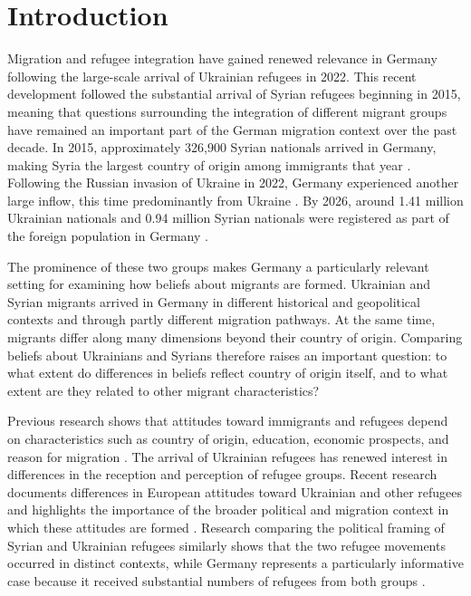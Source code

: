 \section{Introduction}

Migration and refugee integration have gained renewed relevance in Germany following the large-scale arrival of 
Ukrainian refugees in 2022. This recent development followed the substantial arrival of Syrian refugees beginning 
in 2015, meaning that questions surrounding the integration of different migrant groups have remained an important 
part of the German migration context over the past decade. In 2015, approximately 326,900 Syrian nationals arrived 
in Germany, making Syria the largest country of origin among immigrants that year \citep{bamf2015migration}. 
Following the Russian invasion of Ukraine in 2022, Germany experienced another large inflow, this time predominantly 
from Ukraine \citep{bamf2022migration}. By 2026, around 1.41 million Ukrainian nationals and 0.94 million Syrian 
nationals were registered as part of the foreign population in Germany \citep{destatis2026foreign}.

The prominence of these two groups makes Germany a particularly relevant setting for examining how beliefs about 
migrants are formed. Ukrainian and Syrian migrants arrived in Germany in different historical and geopolitical 
contexts and through partly different migration pathways. At the same time, migrants differ along many 
dimensions beyond their country of origin. Comparing 
beliefs about Ukrainians and Syrians therefore raises an important question: to what extent do differences in beliefs 
reflect country of origin itself, and to what extent are they related to other migrant characteristics?

Previous research shows that attitudes toward immigrants and refugees depend on characteristics such as country of 
origin, education, economic prospects, and reason for migration \citep{bansak2016economic, czymara2016deutschland}. 
The arrival of Ukrainian refugees has renewed interest in differences in the reception and perception of refugee groups. 
Recent research documents differences in European attitudes toward Ukrainian and other refugees and highlights the 
importance of the broader political and migration context in which these attitudes are formed \citep{moise2024european}. Research comparing the political framing of Syrian and Ukrainian refugees similarly shows that the two refugee movements occurred in distinct contexts, while Germany represents a particularly informative case because it received substantial numbers of refugees from both groups \citep{drewski2025states}.

